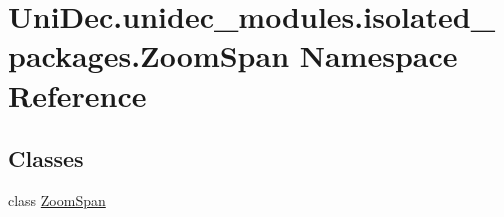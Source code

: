 \hypertarget{namespace_uni_dec_1_1unidec__modules_1_1isolated__packages_1_1_zoom_span}{}\section{Uni\+Dec.\+unidec\+\_\+modules.\+isolated\+\_\+packages.\+Zoom\+Span Namespace Reference}
\label{namespace_uni_dec_1_1unidec__modules_1_1isolated__packages_1_1_zoom_span}
\subsection*{Classes}
\begin{DoxyCompactItemize}
\item 
class \hyperlink{class_uni_dec_1_1unidec__modules_1_1isolated__packages_1_1_zoom_span_1_1_zoom_span}{Zoom\+Span}
\end{DoxyCompactItemize}
